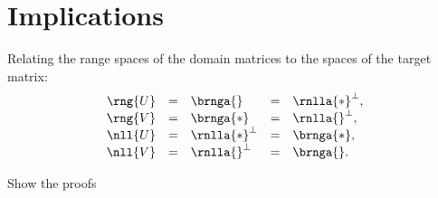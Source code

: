 \section{Implications}
Relating the range spaces of the domain matrices to the spaces of the target matrix:
\begin{equation}
  \begin{array}{rclcl}
     \rng{U} &=& \brnga{}  &=& \rnlla{*}^{\perp},\\
     \rng{V} &=& \brnga{*} &=& \rnlla{}^{\perp},\\
     \nll{U} &=& \rnlla{*}^{\perp} &=& \brnga{*},\\
     \nll{V} &=& \rnlla{}^{\perp} &=& \brnga{}.\\
  \end{array}
\end{equation}

Show the proofs

\endinput